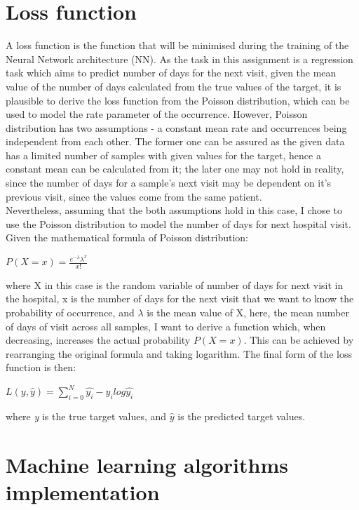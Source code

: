 \documentclass[letterpaper, 12 pt, conference]{ieeeconf}  %
\begin{document}
\section{Loss function}
A loss function is the function that will be minimised during the training of the Neural Network architecture (NN). As the task in this assignment is a regression task which aims to predict number of days for the next visit, given the mean value of the number of days calculated from the true values of the target, it is plausible to derive the loss function from the Poisson distribution, which can be used to model the rate parameter of the occurrence. However, Poisson distribution has two assumptions - a constant mean rate and occurrences being independent from each other. The former one can be assured as the given data has a limited number of samples with given values for the target, hence a constant mean can be calculated from it; the later one may not hold in reality, since the number of days for a sample's next visit may be dependent on it's previous visit, since the values come from the same patient. \\\newline
Nevertheless, assuming that the both assumptions hold in this case, I chose to use the Poisson distribution to model the number of days for next hospital visit. \\\newline
Given the mathematical formula of Poisson distribution:
\begin{center}
$P\left(X= x \right) = \frac{{e^{ - \lambda } \lambda ^x }}{{x!}}$    
\end{center}
where X in this case is the random variable of number of days for next visit in the hospital, x is the number of days for the next visit that we want to know the probability of occurrence, and $\lambda$ is the mean value of X, here, the mean number of days of visit across all samples, I want to derive a function which, when decreasing, increases the actual probability $P\left(X= x \right)$. This can be achieved by rearranging the original formula and taking logarithm. The final form of the loss function is then:
\begin{center}
    $L(y, \hat{y}) = \sum_{i=0}^{N}\hat{y_i} - y_i log \hat{y_i}$
\end{center}
where \textit{y} is the true target values, and $\hat{y}$ is the predicted target values.

\section{Machine learning algorithms implementation}
\end{document}
